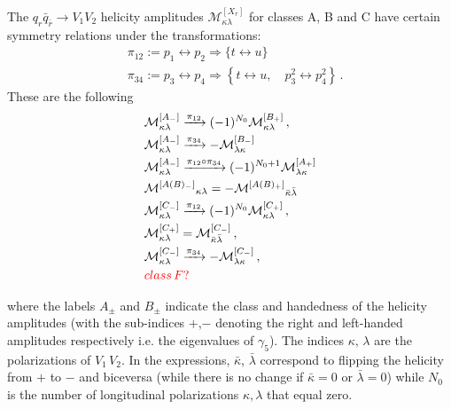 \documentclass[aps,prl,twocolumn,superscriptaddress,amsfont,graphicx,preprintnumbers]{revtex4-1}
\newcommand{\red}[1]{{\color{Red}{#1}}}
\newcommand{\MKL}{\mathcal{M}^{[X_r]}_{\kappa\lambda}}
\newcommand{\MAkl}[2]{\mathcal{M}^{[A_#1]}_{#2}}
\newcommand{\MBkl}[2]{\mathcal{M}^{[B_#1]}_{#2}}
\newcommand{\MCkl}[2]{\mathcal{M}^{[C_#1]}_{#2}}
\begin{document}
The $q_r\bar{q}_{\bar{r}}\to V_1V_2$ helicity amplitudes $\MKL$ for classes A, B and C have certain symmetry relations under the transformations:
\begin{equation}
\begin{aligned}
&\pi_{12}:=p_{1} \leftrightarrow p_{2} \Rightarrow\{t \leftrightarrow u\} \\ 
&\pi_{34}:=p_{3} \leftrightarrow p_{4} \Rightarrow\left\{t \leftrightarrow u, \quad p_{3}^{2} \leftrightarrow p_{4}^{2}\right\} \,.
\end{aligned}
\end{equation}
These are the following
\begin{equation}
\begin{aligned}
&\MAkl{-}{\kappa\lambda} \xrightarrow{\pi_{12}} (-1)^{N_0} \MBkl{+}{\kappa\lambda}\,, \\
   & \MAkl{-}{\kappa\lambda} \xrightarrow{\pi_{34}} -\MBkl{-}{\lambda\kappa} \\
  & \MAkl{-}{\kappa\lambda}  \xrightarrow{\pi_{12}\circ\pi_{34}} (-1)^{N_0+1} \MAkl{+}{\lambda\kappa} \\
&{\mathcal{M}^{[A(B)_-]}}_{\kappa\lambda} =
    - {\mathcal{M}^{[A(B)_+]}}_{\bar{\kappa}\bar{\lambda}} \\
& \MCkl{-}{\kappa\lambda} \xrightarrow{\pi_{12}} (-1)^{N_0} 
\MCkl{+}{\kappa\lambda}\,, \\
&\MCkl{+}{\kappa\lambda} =\MCkl{-}{\bar\kappa\bar\lambda}  \,, \\
& \MCkl{-}{\kappa\lambda} \xrightarrow{\pi_{34}}
-\MCkl{-}{\lambda\kappa}\,,\\
&\red{class\, F?}
    \end{aligned}
\end{equation}


where the labels $A_\pm$ and $B_\pm$ indicate the class and handedness of the helicity amplitudes (with the sub-indices $+$,$-$ denoting the right and left-handed amplitudes respectively i.e. the eigenvalues of $\gamma_5$). The indices $\kappa,\,\lambda$ are the polarizations of $V_1\,V_2$. In the expressions, $\bar{\kappa}$, $\bar{\lambda}$ correspond to flipping the helicity from $+$ to $-$ and biceversa (while there is no change if  $\bar{\kappa}=0$ or $\bar{\lambda}=0$) while $N_0$ is the number of longitudinal polarizations $\kappa,\lambda$ that equal zero.  
\end{document}
